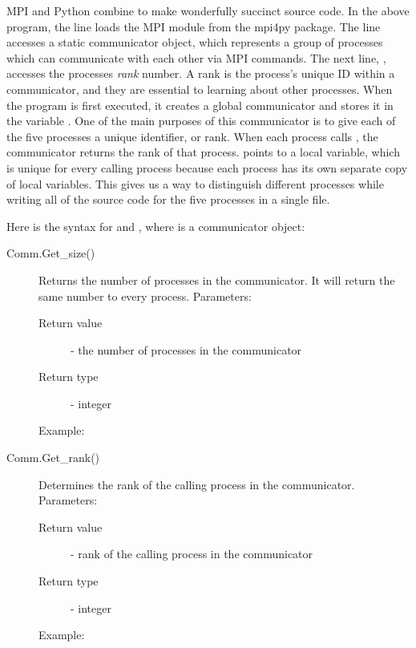 MPI and Python combine to make wonderfully succinct source code. 
In the above program, the line  loads the MPI module from the mpi4py package.
The line  accesses a static communicator object, which represents a group of processes which can communicate with each other via MPI commands.
The next line, , accesses the processes \emph{rank} number. 
A rank is the process's unique ID within a communicator, and they are essential to learning about other processes. 
When the program  is first executed, it creates a global communicator and stores it in the variable . 
One of the main purposes of this communicator is to give each of the five processes a unique identifier, or rank. 
When each process calls , the communicator returns the rank of that process. 
 points to a local variable, which is unique for every calling process because each process has its own separate copy of local variables. 
This gives us a way to distinguish different processes while writing all of the source code for the five processes in a single file.


Here is the syntax for  and , where  is a communicator object:
\begin{description}
\item[Comm.Get\_size()]
Returns the number of processes in the communicator. It will return the same number to every process.
Parameters:
\begin{description}
    \item[Return value] - the number of processes in the communicator
    \item[Return type] - integer
\end{description}
Example:

\item[Comm.Get\_rank()]
Determines the rank of the calling process in the communicator.
Parameters:
\begin{description}
    \item[Return value] - rank of the calling process in the communicator
    \item[Return type] - integer
\end{description}
Example:

\end{description}

